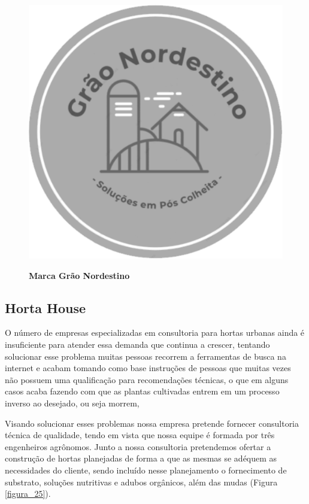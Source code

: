 \begin{figure}[H]
\centering
\caption{\textbf{Marca Grão Nordestino}}
\includegraphics[scale=0.3]{Imagens/graonordestino.png}
\label{figura_21}
\end{figure}



\subsection{Horta House}


O número de empresas especializadas em consultoria para hortas urbanas ainda é insuficiente para atender essa demanda que continua a crescer, tentando solucionar esse problema muitas pessoas recorrem a ferramentas de busca na internet e acabam tomando como base instruções de pessoas que muitas vezes não possuem uma qualificação para recomendações técnicas, o que em alguns casos acaba fazendo com que as plantas cultivadas entrem em um processo inverso ao desejado, ou seja morrem,

Visando solucionar esses problemas nossa empresa pretende fornecer consultoria técnica de qualidade, tendo em vista que nossa equipe é formada por três engenheiros agrônomos. Junto a nossa
consultoria pretendemos ofertar a construção de hortas planejadas de forma a que as mesmas se adéquem as necessidades do cliente, sendo incluído nesse planejamento o fornecimento de substrato, soluções nutritivas e adubos orgânicos, além das mudas (Figura \ref{figura_25}).



